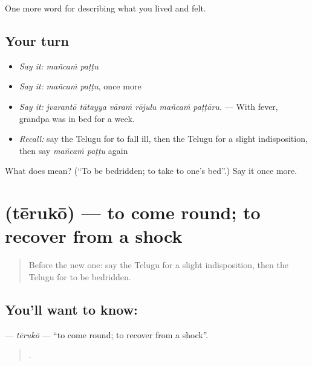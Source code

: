 \begin{grammarlens}[title={What you've built}]
One more word for describing what you lived and felt.
\end{grammarlens}

\subsection*{Your turn}
\begin{itemize}
\raggedright
  \item \emph{Say it:} \emph{mañcaṁ paṭṭu}
  \item \emph{Say it:} \emph{mañcaṁ paṭṭu}, once more
  \item \emph{Say it:} \emph{jvarantō tātayya vāraṁ rōjulu mañcaṁ paṭṭāru.} — With fever, grandpa was in bed for a week.
  \item \emph{Recall:} say the Telugu for to fall ill, then the Telugu for a slight indisposition, then say \emph{mañcaṁ paṭṭu} again
\end{itemize}

\begin{tcolorbox}[breakable,colback=teal!4,colframe=teal!35!black,title={Before you move on}]
What does   mean? (\textquotedblleft{}To be bedridden; to take to one's bed\textquotedblright{}.) Say it once more.
\end{tcolorbox}
\section[\texorpdfstring{\te{తేరుకో} (tērukō)}{తేరుకో (tērukō)}]{ (tērukō) — to come round; to recover from a shock}

\label{lesson:TE-C512-teruko}



\begin{quote}
Before the new one: say the Telugu for a slight indisposition, then the Telugu for to be bedridden.
\end{quote}

\subsection*{You'll want to know: }
\textbf{} — \emph{tērukō} — \textquotedblleft{}to come round; to recover from a shock\textquotedblright{}.

\begin{quote}
      .
\end{quote}

